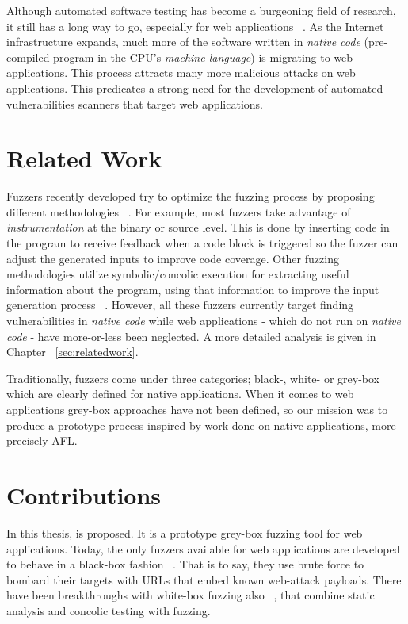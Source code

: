 Although automated software testing has become a burgeoning field of research, it still has a long way to go, especially for web applications ~\cite{doupe2010johnny}. As the Internet infrastructure expands, much more of the software written in \emph{native code} (pre-compiled program in the CPU's \emph{machine language}) is migrating to web applications. This process attracts many more malicious attacks on web applications. This predicates a strong need for the development of automated vulnerabilities scanners that target web applications.
 
\section{Related Work}
Fuzzers recently developed try to optimize the fuzzing process by proposing different methodologies ~\cite{godefroid2012sage, stephens2016driller, rawat2017vuzzer, aschermann2019nautilus, aschermann2019redqueen, hoffman2020Was, osterlund2020parmesan}. 
For example, most fuzzers take advantage of \emph{instrumentation} at the binary or source level. This is done by inserting code in the program to receive feedback when a code block is
triggered so the fuzzer can adjust the generated inputs to improve code coverage. 
Other fuzzing methodologies utilize symbolic/concolic execution for extracting useful information about the program, using that information to improve the input generation process ~\cite{Godefroid2008AutomatedWF,stephens2016driller,godefroid2005dart,godefroid2012sage}. However, all these fuzzers currently target finding vulnerabilities in \emph{native code} while web applications - which do not run on \emph{native code} - have more-or-less been neglected. A more detailed analysis is given in Chapter ~\ref{sec:relatedwork}.

Traditionally, fuzzers come under three categories; black-, white- or grey-box which are clearly defined for native applications. When it comes to web applications grey-box approaches have not been defined, so our mission was to produce a prototype process inspired by work done on native applications, more precisely AFL.

\section{Contributions}
In this thesis, \pname{} is proposed. It is a prototype grey-box fuzzing tool for web applications. Today, the only fuzzers available for web applications are developed to behave in a black-box fashion ~\cite{doupe2010johnny}. That is to say, they use brute force to bombard their targets with URLs that embed known web-attack payloads. There have been breakthroughs with white-box fuzzing also ~\cite{navex2018,Borges2018BaZINGAWF}, that combine static analysis and concolic testing with fuzzing.

